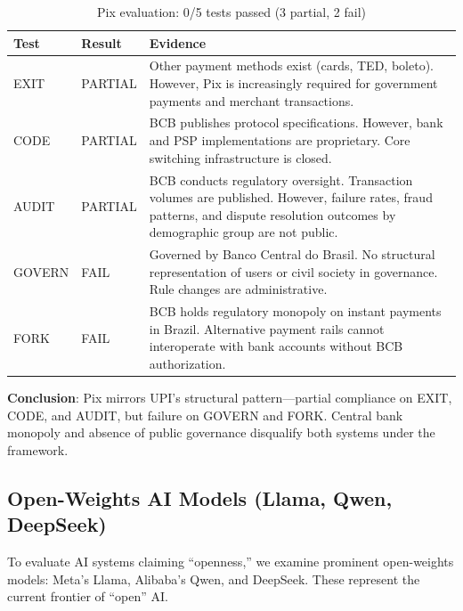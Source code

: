 \documentclass[11pt,a4paper]{article}
\newcommand{\tfail}{\textcolor{failred}{FAIL}}
\newcommand{\tpartial}{\textcolor{partialorange}{PARTIAL}}
\begin{document}
\begin{table}[htbp]
\centering
\begin{tabular}{@{}llp{7cm}@{}}
\toprule
\textbf{Test} & \textbf{Result} & \textbf{Evidence} \\
\midrule
EXIT & \tpartial & Other payment methods exist (cards, TED, boleto). However, Pix is increasingly required for government payments and merchant transactions. \\
\addlinespace
CODE & \tpartial & BCB publishes protocol specifications. However, bank and PSP implementations are proprietary. Core switching infrastructure is closed. \\
\addlinespace
AUDIT & \tpartial & BCB conducts regulatory oversight. Transaction volumes are published. However, failure rates, fraud patterns, and dispute resolution outcomes by demographic group are not public. \\
\addlinespace
GOVERN & \tfail & Governed by Banco Central do Brasil. No structural representation of users or civil society in governance. Rule changes are administrative. \\
\addlinespace
FORK & \tfail & BCB holds regulatory monopoly on instant payments in Brazil. Alternative payment rails cannot interoperate with bank accounts without BCB authorization. \\
\bottomrule
\end{tabular}
\caption{Pix evaluation: 0/5 tests passed (3 partial, 2 fail)}
\end{table}

\textbf{Conclusion}: Pix mirrors UPI's structural pattern---partial compliance on EXIT, CODE, and AUDIT, but failure on GOVERN and FORK. Central bank monopoly and absence of public governance disqualify both systems under the framework.

\subsection{Open-Weights AI Models (Llama, Qwen, DeepSeek)}

To evaluate AI systems claiming ``openness,'' we examine prominent open-weights models: Meta's Llama, Alibaba's Qwen, and DeepSeek. These represent the current frontier of ``open'' AI.
\end{document}
